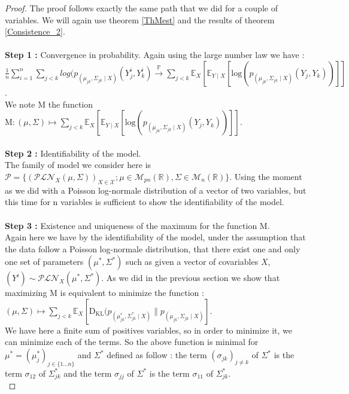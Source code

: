 \documentclass[11pt, a4paper]{article}
\begin{document}
\begin{proof}
The proof follows exactly the same path that we did for a couple of variables. We will again use theorem \ref{ThMest} and the results of theorem \ref{Consistence_2}.\\
\\
\textbf{Step 1 :} Convergence in probability.
Again using the large number law we have :\\
 $\frac{1}{n}\sum_{i=1}^{n} \sum_{j<k} log(p_{(\mu_{jk},\Sigma_{jk} \mid X)} (Y^i_j,Y^i_k) \overset{\mathbb{P}}{\longrightarrow} \sum_{j<k}\mathbb{E}_X [\mathbb{E}_{Y \mid X}[\mathrm{log}(p_{(\mu_{jk},\Sigma_{jk} \mid X)}(Y_j,Y_k))]]$.\\
 We note M the function $\mathrm{M} : (\mu, \Sigma) \mapsto \sum_{j<k}\mathbb{E}_X [\mathbb{E}_{Y \mid X}[\mathrm{log}(p_{(\mu_{jk},\Sigma_{jk} \mid X)}(Y_j,Y_k))]]$.\\
 \\
 \textbf{Step 2 :} Identifiability of the model.\\
The family of model we consider here is $\mathcal{P}=\{ (\mathcal{PLN}_X(\mu,\Sigma))_{X \in \mathcal{X}}; \mu \in \mathcal{M}_{pn}(\mathbb{R}), \Sigma \in \mathcal{M}_n(\mathbb{R})\}$. Using the moment as we did with a Poisson log-normale distribution of a vector of two variables, but this time for n variables is sufficient to show the identifiability of the model.\\
\\
\textbf{Step 3 :} Existence and uniqueness of the maximum for the function M.\\
Again here we have by the identifiability of the model, under the assumption that the data follow a Poisson log-normale distribution, that there exist one and only one set of parameters $(\mu^\ast, \Sigma^\ast)$ such as given a vector of covariables $X$, $(Y^i) \sim \mathcal{PLN}_X (\mu^\ast, \Sigma^\ast)$. As we did in the previous section we show that maximizing M is equivalent to minimize the function :\\
$(\mu, \Sigma) \mapsto \sum_{j<k} \mathbb{E}_X [\mathrm{D_{KL}}(p_{(\mu^\ast_{jk},\Sigma^\ast_{jk} \mid X)} \parallel p_{(\mu_{jk},\Sigma_{jk} \mid X)}]$.\\
We have here a finite sum of positives variables, so in order to minimize it, we can minimize each of the terms. So the above function is minimal for $\mu^\ast=(\mu_j^\ast)_{j \in \{1...n\}}$ and $\Sigma^\ast$ defined as follow : the term $(\sigma_{jk})_{j \neq k}$ of $\Sigma^\ast$ is the term $\sigma_{12}$ of $\Sigma^\ast_{jk}$  and the term $\sigma_{jj}$ of $\Sigma^\ast$ is the term $\sigma_{11}$ of $\Sigma^\ast_{jk}$.\\

\end{proof}
\end{document}
